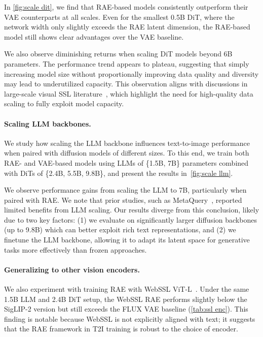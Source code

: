 \documentclass[10pt,twocolumn,letterpaper]{article}
\begin{document}
In \cref{fig:scale dit}, we find that RAE-based models consistently outperform their VAE counterparts at all scales. 
Even for the smallest 0.5B DiT, where the network width only slightly exceeds the RAE latent dimension, the RAE-based model still shows clear advantages over the VAE baseline.




We also observe diminishing returns when scaling DiT models beyond 6B parameters. The performance trend appears to plateau, suggesting that simply increasing model size without proportionally improving data quality and diversity may lead to underutilized capacity.
This observation aligns with discussions in large-scale visual SSL literature~\citep{fan2025scaling}, which highlight the need for high-quality data scaling to fully exploit model capacity.

\paragraph{Scaling LLM backbones.}
We study how scaling the LLM backbone influences text-to-image performance when paired with diffusion models of different sizes. 
To this end, we train both RAE- and VAE-based models using LLMs of \{1.5B, 7B\} parameters combined with DiTs of \{2.4B, 5.5B, 9.8B\}, and present the results in~\cref{fig:scale llm}.

We observe performance gains from scaling the LLM to 7B, particularly when paired with RAE. We note that prior studies, such as MetaQuery~\citep{metaquery}, reported limited benefits from LLM scaling. Our results diverge from this conclusion, likely due to two key factors: (1) we evaluate on significantly larger diffusion backbones (up to 9.8B) which can better exploit rich text representations, and (2) we finetune the LLM backbone, allowing it to adapt its latent space for generative tasks more effectively than frozen approaches.


\paragraph{Generalizing to other vision encoders.}
We also experiment with training RAE with WebSSL ViT-L~\citep{fan2025scaling}. 
Under the same 1.5B LLM and 2.4B DiT setup, the WebSSL RAE performs slightly below the SigLIP-2 version but still exceeds the FLUX VAE baseline (\cref{tab:ssl enc}). This finding is notable because WebSSL is not explicitly aligned with text; it suggests that the RAE framework in T2I training is robust to the choice of encoder.
\end{document}
